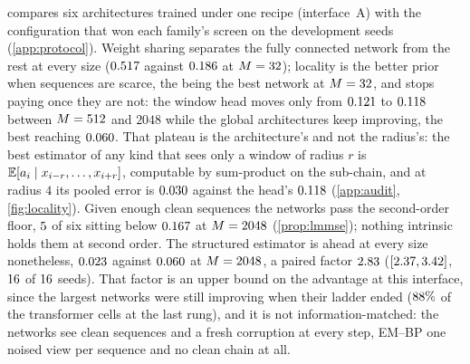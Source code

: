 
 compares six architectures trained under one recipe (interface~A)
with the configuration that won each family's screen on the development seeds
(\cref{app:protocol}). Weight sharing separates the fully connected network from the rest
at every size ($0.517$ against $0.186$ at $M=32$); locality is the better
prior when sequences are scarce, the \baseBestArchA{} being the best network at
$M=32$, and stops paying once they are not: the window head moves only from
$0.121$ to $0.118$ between $M=512$ and $2048$ while the global
architectures keep improving, the best reaching $0.060$. That plateau is the
architecture's and not the radius's: the best estimator of any kind that sees only a
window of radius $r$ is $\mathbb{E}[a_i\mid x_{i-r},\dots,x_{i+r}]$, computable by sum-product on
the sub-chain, and at radius $4$ its pooled error is $0.030$
against the head's $0.118$ (\cref{app:audit}, \cref{fig:locality}). Given enough
clean sequences the networks pass the second-order floor, $5$ of six
sitting below $0.167$ at $M=2048$ (\cref{prop:lmmse}); nothing intrinsic holds
them at second order. The structured estimator is ahead at every size nonetheless,
$0.023$ against $0.060$ at $M=2048$, a paired factor $2.83$
($[2.37,3.42]$, $16$ of $16$ seeds). That
factor is an upper bound on the advantage at this interface, since the largest networks
were still improving when their ladder ended ($88\%$ of the
transformer cells at the last rung), and it is not information-matched: the networks see
clean sequences and a fresh corruption at every step, EM--BP one noised view per sequence
and no clean chain at all.

